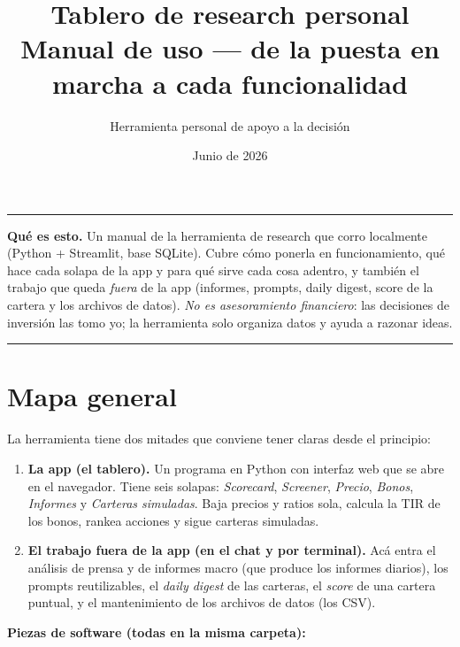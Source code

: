 \documentclass[11pt,a4paper]{article}
\title{\textbf{Tablero de research personal}\\[3pt]
\large Manual de uso --- de la puesta en marcha a cada funcionalidad}
\author{Herramienta personal de apoyo a la decisi\'on}
\date{Junio de 2026}
\begin{document}
\maketitle
\thispagestyle{fancy}

\noindent\rule{\textwidth}{0.4pt}

\small
\textbf{Qu\'e es esto.} Un manual de la herramienta de research que corro localmente
(Python + Streamlit, base SQLite). Cubre c\'omo ponerla en funcionamiento, qu\'e hace
cada solapa de la app y para qu\'e sirve cada cosa adentro, y tambi\'en el trabajo que
queda \emph{fuera} de la app (informes, prompts, daily digest, score de la cartera y
los archivos de datos). \emph{No es asesoramiento financiero}: las decisiones de
inversi\'on las tomo yo; la herramienta solo organiza datos y ayuda a razonar ideas.
\normalsize

\noindent\rule{\textwidth}{0.4pt}

\tableofcontents
\vspace{0.4cm}

\section{Mapa general}

La herramienta tiene dos mitades que conviene tener claras desde el principio:

\begin{enumerate}[leftmargin=1.4em]
  \item \textbf{La app (el tablero).} Un programa en Python con interfaz web que se
  abre en el navegador. Tiene seis solapas: \emph{Scorecard}, \emph{Screener},
  \emph{Precio}, \emph{Bonos}, \emph{Informes} y \emph{Carteras simuladas}. Baja
  precios y ratios sola, calcula la TIR de los bonos, rankea acciones y sigue
  carteras simuladas.
  \item \textbf{El trabajo fuera de la app (en el chat y por terminal).} Ac\'a entra
  el an\'alisis de prensa y de informes macro (que produce los informes diarios), los
  prompts reutilizables, el \emph{daily digest} de las carteras, el \emph{score} de
  una cartera puntual, y el mantenimiento de los archivos de datos (los CSV).
\end{enumerate}

\noindent\textbf{Piezas de software (todas en la misma carpeta):}
\end{document}
